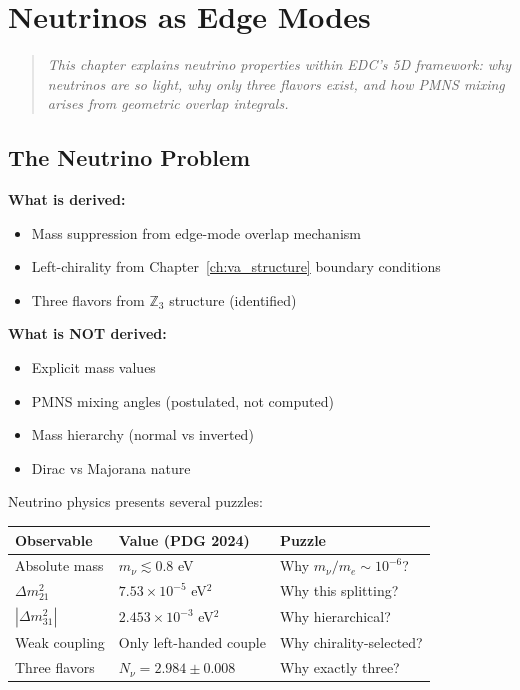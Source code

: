 \chapter{Neutrinos as Edge Modes}
\label{ch:neutrinos}

\begin{quote}
\textit{This chapter explains neutrino properties within EDC's 5D framework:
why neutrinos are so light, why only three flavors exist, and how PMNS
mixing arises from geometric overlap integrals.}
\end{quote}

\section{The Neutrino Problem}
\label{sec:nu_problem}

\begin{tcolorbox}[edcGuardrail, title=\textbf{Epistemic Status}]
\textbf{What is derived:}
\begin{itemize}[nosep]
    \item Mass suppression from edge-mode overlap mechanism \tagDc{}
    \item Left-chirality from Chapter~\ref{ch:va_structure} boundary conditions \tagDc{}
    \item Three flavors from $\mathbb{Z}_3$ structure (identified) \tagI{}
\end{itemize}

\textbf{What is NOT derived:}
\begin{itemize}[nosep]
    \item Explicit mass values
    \item PMNS mixing angles (postulated, not computed)
    \item Mass hierarchy (normal vs inverted)
    \item Dirac vs Majorana nature
\end{itemize}
\end{tcolorbox}

Neutrino physics presents several puzzles:

\begin{center}
\begin{tabular}{lll}
\toprule
\textbf{Observable} & \textbf{Value (PDG 2024)} & \textbf{Puzzle} \\
\midrule
Absolute mass & $m_\nu \lesssim 0.8$ eV & Why $m_\nu/m_e \sim 10^{-6}$? \\
$\Delta m_{21}^2$ & $7.53 \times 10^{-5}$ eV$^2$ & Why this splitting? \\
$|\Delta m_{31}^2|$ & $2.453 \times 10^{-3}$ eV$^2$ & Why hierarchical? \\
Weak coupling & Only left-handed couple & Why chirality-selected? \\
Three flavors & $N_\nu = 2.984 \pm 0.008$ & Why exactly three? \\
\bottomrule
\end{tabular}
\end{center}

